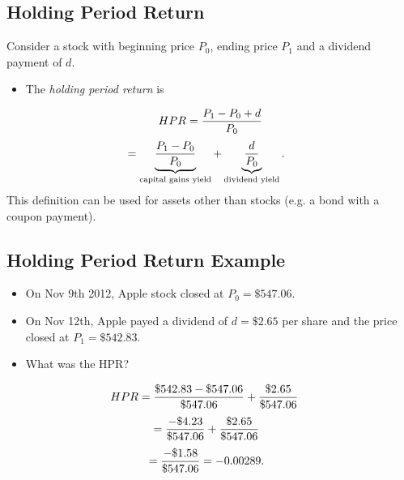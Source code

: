 \documentclass[letterpaper,10pt,english]{sphinxmanual}
\begin{document}
\subsection{Holding Period Return}
\label{returns:holding-period-return}
Consider a stock with beginning price $P_0$, ending price
$P_1$ and a dividend payment of $d$.
\begin{itemize}
\item {} 
The \emph{holding period return} is

\end{itemize}
\begin{gather}
\begin{split}HPR & = \frac{P_1 - P_0 + d}{P_0} \\\end{split}\notag
\end{gather}\begin{gather}
\begin{split}& = \underbrace{\frac{P_1 - P_0}{P_0}}_\text{capital gains yield} +
\underbrace{\frac{d}{P_0}}_\text{dividend yield}.\end{split}\notag
\end{gather}
This definition can be used for assets other than stocks (e.g. a bond
with a coupon payment).


\subsection{Holding Period Return Example}
\label{returns:holding-period-return-example}\begin{itemize}
\item {} 
On Nov 9th 2012, Apple stock closed at $P_0 = \$547.06$.

\end{itemize}
\begin{itemize}
\item {} 
On Nov 12th, Apple payed a dividend of $d = \$2.65$ per share
and the price closed at $P_1 = \$542.83$.

\end{itemize}
\begin{itemize}
\item {} 
What was the HPR?

\end{itemize}
\begin{gather}
\begin{split}HPR & = \frac{\$542.83 - \$547.06}{\$547.06} + \frac{\$2.65}{\$547.06}\end{split}\notag
\end{gather}\begin{gather}
\begin{split}& = \frac{-\$4.23}{\$547.06} + \frac{\$2.65}{\$547.06}\end{split}\notag
\end{gather}\begin{gather}
\begin{split}& = \frac{-\$1.58}{\$547.06} = -0.00289.\end{split}\notag
\end{gather}
\end{document}
